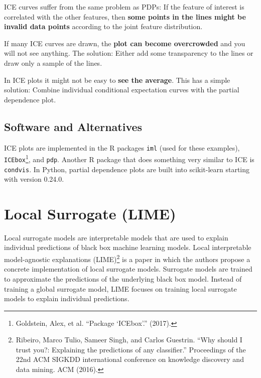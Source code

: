 \documentclass[12pt,]{krantz}
\begin{document}
ICE curves suffer from the same problem as PDPs: If the feature of
interest is correlated with the other features, then \textbf{some points
in the lines might be invalid data points} according to the joint
feature distribution.

If many ICE curves are drawn, the \textbf{plot can become overcrowded}
and you will not see anything. The solution: Either add some
transparency to the lines or draw only a sample of the lines.

In ICE plots it might not be easy to \textbf{see the average}. This has
a simple solution: Combine individual conditional expectation curves
with the partial dependence plot.

\subsection{Software and
Alternatives}\label{software-and-alternatives-3}

ICE plots are implemented in the R packages \texttt{iml} (used for these
examples), \texttt{ICEbox}\footnote{Goldstein, Alex, et al. ``Package
  `ICEbox'.'' (2017).}, and \texttt{pdp}. Another R package that does
something very similar to ICE is \texttt{condvis}. In Python, partial
dependence plots are built into scikit-learn starting with version
0.24.0.

\newpage

\hypertarget{lime}{\section{Local Surrogate (LIME)}\label{lime}}

Local surrogate models are interpretable models that are used to explain
individual predictions of black box machine learning models. Local
interpretable model-agnostic explanations (LIME)\footnote{Ribeiro, Marco
  Tulio, Sameer Singh, and Carlos Guestrin. ``Why should I trust you?:
  Explaining the predictions of any classifier.'' Proceedings of the
  22nd ACM SIGKDD international conference on knowledge discovery and
  data mining. ACM (2016).} is a paper in which the authors propose a
concrete implementation of local surrogate models. Surrogate models are
trained to approximate the predictions of the underlying black box
model. Instead of training a global surrogate model, LIME focuses on
training local surrogate models to explain individual predictions.
\end{document}
